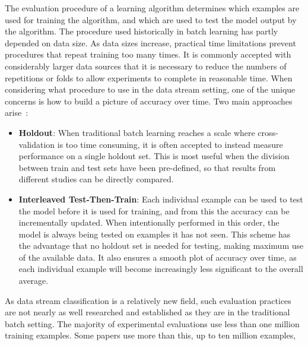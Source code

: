 The evaluation procedure of a learning algorithm determines which examples
are used for training the algorithm, and which are used to test the model output
by the algorithm. The procedure used historically in batch learning has partly
depended on data size. As data sizes increase, practical
time limitations prevent procedures that repeat training too many times. It is
commonly accepted with considerably larger data sources that it is necessary
to reduce the numbers of repetitions or folds to allow experiments to complete
in reasonable time. 
    When considering what procedure to use in the data stream setting, one of
the unique concerns is how to build a picture of accuracy over time. Two main
approaches arise~\cite{Kirkby-PhD}:
\begin{itemize}
 \item {\bf Holdout}:
When traditional batch learning reaches a scale where cross-validation is too time 
consuming, it is often accepted to instead measure performance on a single holdout
set. This is most useful when the division between train and test sets have
been pre-defined, so that results from different studies can be directly compared. 
\item {\bf Interleaved Test-Then-Train}:
 Each individual example can be used to test the model
before it is used for training, and from this the accuracy can be incrementally
updated. When intentionally performed in this order, the model is always
being tested on examples it has not seen. This scheme has the advantage that
no holdout set is needed for testing, making maximum use of the available
data. It also ensures a smooth plot of accuracy over time, as each individual
example will become increasingly less significant to the overall average.
\end{itemize}
   As data stream classification is a relatively new field, such evaluation 
practices are not nearly as well researched and established as they are
in the traditional batch setting. 
The majority of experimental evaluations use less than one million
training examples. Some papers use more than this, up to ten million examples,
